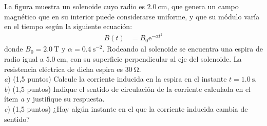 \documentclass[a4paper,11pt,dvipsnames]{article}
\newcommand\mycoil[3] %
{%
  \begin{scope}[shift={#1},x={(-#3*\xx cm,-\xy cm)},y={(#3*\xx cm,-\xy cm)}]  
    \foreach\i in {0,...,#2}
    {%
      \begin{pgfonlayer}{background}
        \draw plot[variable=\x,domain=0.5:1,samples=40,smooth]
          ({0.5*sin(360*\x-45)},{0.5*cos(360*\x-45)},{0.4*(\x+\i)});
      \end{pgfonlayer}
      \begin{pgfonlayer}{foreground}
        \draw[preaction={draw,white,line width=2pt}] plot[variable=\x,domain=0:0.5,samples=40,smooth]
          ({0.5*sin(360*\x-45)},{0.5*cos(360*\x-45)},{0.4*(\x+\i)});
      \end{pgfonlayer}
    }
    \pgfmathtruncatemacro\h{#2+1} %
    \begin{pgfonlayer}{foreground}
      \foreach\i in {0,\h}
      {%
        \draw[line cap=round] (0,0,0.4*\i) ++ (135:0.5) --++ (135:0.5);
        \draw[fill=white]     (0,0,0.4*\i) ++ (135:1) circle (1pt);
      }
    \end{pgfonlayer}
  \end{scope}
}
\begin{document}
\begin{enumerate}[label=E\arabic*.,leftmargin=*]
\begin{minipage}[t]{.6\textwidth}
\item La figura muestra un solenoide cuyo radio es $\SI{2.0}{\centi\metre}$, que genera un campo magnético que en su interior puede considerarse uniforme, y que su módulo varía en el tiempo según la siguiente ecuación:
\begin{align*}
  B(t) &= B_0 \text{e}^{-\alpha t^2}
\end{align*}
donde $B_0 = \SI{2.0}{\tesla}$ y $\alpha = \SI{0.4}{\second^{-2}}$. Rodeando al solenoide se encuentra una espira de radio igual a $\SI{5.0}{\centi\metre}$, con su superficie perpendicular al eje del solenoide. La resistencia eléctrica de dicha espira es $\SI{30}{\ohm}$.\\
\textit{a}) ({\small 1,5 puntos}) Calcule la corriente inducida en la espira en el instante $t = \SI{1.0}{\second}$.\\
\textit{b}) ({\small 1,5 puntos}) Indique el sentido de circulación de la corriente calculada en el ítem \textit{a} y justifique su respuesta.\\
\textit{c}) ({\small 1,5 puntos}) ¿Hay algún instante en el que la corriente inducida cambia de sentido?
\end{minipage}
\begin{minipage}[t]{.4\textwidth}
  \strut\vspace*{-\baselineskip}
  \begin{center}
\end{center}
\end{minipage}


\end{enumerate}
\end{document}

